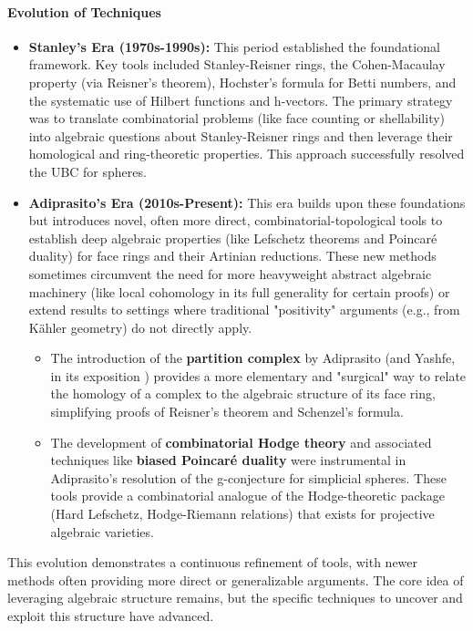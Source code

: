 \documentclass[12pt]{article}
\theoremstyle{definition}
\numberwithin{equation}{subsection}
\begin{document}
\paragraph{Evolution of Techniques}
\begin{itemize}
\item \textbf{Stanley's Era (1970s-1990s):} This period established the foundational framework. Key tools included Stanley-Reisner rings, the Cohen-Macaulay property (via Reisner's theorem), Hochster's formula for Betti numbers, and the systematic use of Hilbert functions and h-vectors. The primary strategy was to translate combinatorial problems (like face counting or shellability) into algebraic questions about Stanley-Reisner rings and then leverage their homological and ring-theoretic properties. This approach successfully resolved the UBC for spheres.
\item \textbf{Adiprasito's Era (2010s-Present):} This era builds upon these foundations but introduces novel, often more direct, combinatorial-topological tools to establish deep algebraic properties (like Lefschetz theorems and Poincaré duality) for face rings and their Artinian reductions. These new methods sometimes circumvent the need for more heavyweight abstract algebraic machinery (like local cohomology in its full generality for certain proofs) or extend results to settings where traditional "positivity" arguments (e.g., from Kähler geometry) do not directly apply.
\begin{itemize}
\item The introduction of the \textbf{partition complex} by Adiprasito (and Yashfe, in its exposition ) provides a more elementary and "surgical" way to relate the homology of a complex to the algebraic structure of its face ring, simplifying proofs of Reisner's theorem and Schenzel's formula.
\item The development of \textbf{combinatorial Hodge theory}  and associated techniques like \textbf{biased Poincaré duality}  were instrumental in Adiprasito's resolution of the g-conjecture for simplicial spheres. These tools provide a combinatorial analogue of the Hodge-theoretic package (Hard Lefschetz, Hodge-Riemann relations) that exists for projective algebraic varieties.
\end{itemize}
\end{itemize}
This evolution demonstrates a continuous refinement of tools, with newer methods often providing more direct or generalizable arguments. The core idea of leveraging algebraic structure remains, but the specific techniques to uncover and exploit this structure have advanced.   
\end{document}
